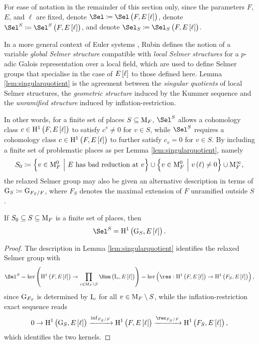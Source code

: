 \begin{notation}
For ease of notation in the remainder of this section only, since the parameters $ F $, $ E $, and $ \ell $ are fixed, denote $ \Sel \coloneqq \Sel\br{F, E\sbr{\ell}} $, denote $ \Sel^S \coloneqq \Sel^S\br{F, E\sbr{\ell}} $, and denote $ \Sel_S \coloneqq \Sel_S\br{F, E\sbr{\ell}} $.
\end{notation}

\begin{remark}
In a more general context of Euler systems \cite[Chapter I]{Rub00}, Rubin defines the notion of a variable \emph{global Selmer structure} compatible with \emph{local Selmer structures} for a $ p $-adic Galois representation over a local field, which are used to define Selmer groups that specialise in the case of $ E\sbr{\ell} $ to those defined here. Lemma \ref{lem:singularquotient} is the agreement between the \emph{singular quotients} of local Selmer structures, the \emph{geometric structure} induced by the Kummer sequence and the \emph{unramified structure} induced by inflation-restriction.
\end{remark}

\pagebreak

In other words, for a finite set of places $ S \subseteq \mathrm{M}_F $, $ \Sel^S $ allows a cohomology class $ c \in \H^1\br{F, E\sbr{\ell}} $ to satisfy $ c^v \ne 0 $ for $ v \in S $, while $ \Sel^S $ requires a cohomology class $ c \in \H^1\br{F, E\sbr{\ell}} $ to further satisfy $ c_v = 0 $ for $ v \in S $. By including a finite set of problematic places as per Lemma \ref{lem:singularquotient}, namely
$$ S_0 \coloneqq \cbr{v \in \M_F^0 \st E \ \text{has bad reduction at} \ v} \cup \cbr{v \in \M_F^0 \st v\br{\ell} \ne 0} \cup \M_F^\infty, $$
the relaxed Selmer group may also be given an alternative description in terms of $ \mathrm{G}_S \coloneqq \mathrm{G}_{F_S / F} $, where $ F_S $ denotes the maximal extension of $ F $ unramified outside $ S $.

\begin{lemma}
\label{lem:relaxedselmer}
If $ S_0 \subseteq S \subseteq \mathrm{M}_F $ is a finite set of places, then
$$ \Sel^S = \H^1\br{\G_S, E\sbr{\ell}}. $$
\end{lemma}

\begin{proof}
The description in Lemma \ref{lem:singularquotient} identifies the relaxed Selmer group with
$$ \Sel^S = \ker \br{\H^1\br{F, E\sbr{\ell}} \to \prod_{v \in \M_F \setminus S} \Hom\br{\I_v, E\sbr{\ell}}} = \ker \br{\res : \H^1\br{F, E\sbr{\ell}} \to \H^1\br{F_S, E\sbr{\ell}}}, $$
since $ \mathrm{G}_{F_S} $ is determined by $ \mathrm{I}_v $ for all $ v \in \mathrm{M}_F \setminus S $, while the inflation-restriction exact sequence reads
$$ 0 \to \H^1\br{\G_S, E\sbr{\ell}} \xrightarrow{\inf_{F_S / F}} \H^1\br{F, E\sbr{\ell}} \xrightarrow{\res_{F_S / F}} \H^1\br{F_S, E\sbr{\ell}}, $$
which identifies the two kernels.
\end{proof}


